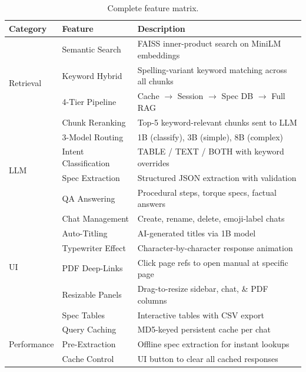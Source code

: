 \documentclass[12pt, a4paper]{article}
\begin{document}
\begin{table}[H]
\centering
\caption{Complete feature matrix.}
\begin{tabularx}{\textwidth}{l l X}
\toprule
\textbf{Category} & \textbf{Feature} & \textbf{Description} \\
\midrule
\multirow{4}{*}{Retrieval} 
  & Semantic Search & FAISS inner-product search on MiniLM embeddings \\
  & Keyword Hybrid & Spelling-variant keyword matching across all chunks \\
  & 4-Tier Pipeline & Cache $\rightarrow$ Session $\rightarrow$ Spec DB $\rightarrow$ Full RAG \\
  & Chunk Reranking & Top-5 keyword-relevant chunks sent to LLM \\
\midrule
\multirow{4}{*}{LLM} 
  & 3-Model Routing & 1B (classify), 3B (simple), 8B (complex) \\
  & Intent Classification & TABLE / TEXT / BOTH with keyword overrides \\
  & Spec Extraction & Structured JSON extraction with validation \\
  & QA Answering & Procedural steps, torque specs, factual answers \\
\midrule
\multirow{6}{*}{UI} 
  & Chat Management & Create, rename, delete, emoji-label chats \\
  & Auto-Titling & AI-generated titles via 1B model \\
  & Typewriter Effect & Character-by-character response animation \\
  & PDF Deep-Links & Click page refs to open manual at specific page \\
  & Resizable Panels & Drag-to-resize sidebar, chat, \& PDF columns \\
  & Spec Tables & Interactive tables with CSV export \\
\midrule
\multirow{3}{*}{Performance} 
  & Query Caching & MD5-keyed persistent cache per chat \\
  & Pre-Extraction & Offline spec extraction for instant lookups \\
  & Cache Control & UI button to clear all cached responses \\
\bottomrule
\end{tabularx}
\end{table}

\end{document}
